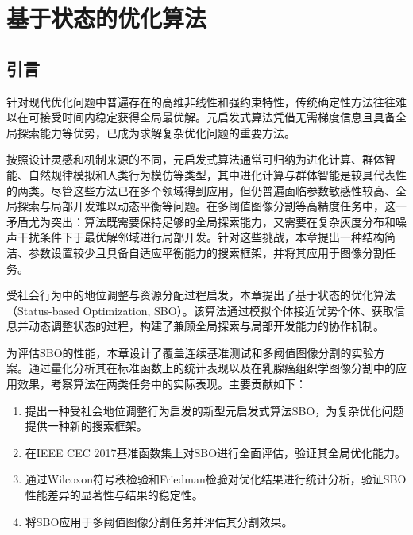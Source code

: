 
\chapter{基于状态的优化算法}
\label{chap:sbo}

\section{引言}

针对现代优化问题中普遍存在的高维非线性和强约束特性，传统确定性方法往往难以在可接受时间内稳定获得全局最优解\cite{sbo_ref1,sbo_ref2,sbo_ref3,sbo_ref4}。元启发式算法凭借无需梯度信息且具备全局探索能力等优势，已成为求解复杂优化问题的重要方法\cite{sbo_ref5,sbo_ref6}。

按照设计灵感和机制来源的不同，元启发式算法通常可归纳为进化计算、群体智能、自然规律模拟和人类行为模仿等类型，其中进化计算与群体智能是较具代表性的两类。尽管这些方法已在多个领域得到应用，但仍普遍面临参数敏感性较高、全局探索与局部开发难以动态平衡等问题\cite{sbo_ref12,sbo_ref19,sbo_ref24,sbo_ref28}。在多阈值图像分割等高精度任务中，这一矛盾尤为突出：算法既需要保持足够的全局探索能力，又需要在复杂灰度分布和噪声干扰条件下于最优解邻域进行局部开发。针对这些挑战，本章提出一种结构简洁、参数设置较少且具备自适应平衡能力的搜索框架，并将其应用于图像分割任务。

受社会行为中的地位调整与资源分配过程启发，本章提出了基于状态的优化算法（Status-based Optimization, SBO）。该算法通过模拟个体接近优势个体、获取信息并动态调整状态的过程，构建了兼顾全局探索与局部开发能力的协作机制\cite{sbo_ref29}。

为评估SBO的性能，本章设计了覆盖连续基准测试和多阈值图像分割的实验方案。通过量化分析其在标准函数上的统计表现以及在乳腺癌组织学图像分割中的应用效果，考察算法在两类任务中的实际表现。主要贡献如下：

\begin{enumerate}
\item 提出一种受社会地位调整行为启发的新型元启发式算法SBO，为复杂优化问题提供一种新的搜索框架。

\item 在IEEE CEC 2017基准函数集上对SBO进行全面评估，验证其全局优化能力。

\item 通过Wilcoxon符号秩检验和Friedman检验对优化结果进行统计分析，验证SBO性能差异的显著性与结果的稳定性。

\item 将SBO应用于多阈值图像分割任务并评估其分割效果。
\end{enumerate}

